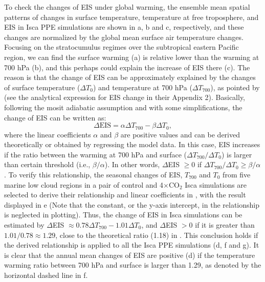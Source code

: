 To check the changes of EIS under global warming, the ensemble mean spatial patterns of changes in surface temperature, temperature at free troposphere, and EIS in Isca PPE simulations are shown in a, b and c, respectively, and these changes are normalized by the global mean surface air temperature changes. Focusing on the stratocumulus regimes over the subtropical eastern Pacific region, we can find the surface warming (a) is relative lower than the warming at 700 hPa (b), and this perhaps could explain the increase of EIS there (c). The reason is that the change of EIS can be approximately explained by the changes of surface temperature ($\Delta T_0$) and temperature at 700 hPa ($\Delta T_{700}$), as pointed by \cite{Qu2014} (see the analytical expression for EIS change in their Appendix 2). Basically, following the mosit adiabatic assumption and with some simplifications, the change of EIS can be written as:
\begin{equation}
    \Delta\text{EIS} =\alpha \Delta T_{700} - \beta \Delta T_0,
    \label{eq:eis_change_T0_T700}
\end{equation}
where the linear coefficients $\alpha$ and $\beta$ are positive values and can be derived theoretically or obtained by regressing the model data. In this case, EIS increases if the ratio between the warming at 700 hPa and surface ($\Delta T_{700}/\Delta T_0$) is larger than certain threshold (i.e., $\beta/\alpha$). In other words, $\Delta$EIS $\geq 0$ if $\Delta T_{700}/\Delta T_0\geq \beta/\alpha$. To verify this relationship, the seasonal changes of EIS, $T_{700}$ and $T_{0}$ from five marine low cloud regions \citep{Klein1993,Qu2014} in a pair of control and 4$\times$CO$_2$ Isca simulations are selected to derive their relationship and linear coefficients in , with the result displayed in e (Note that the constant, or the y-axis intercept, in the relationship is neglected in plotting). Thus, the change of EIS in Isca simulations can be estimated by $\Delta$EIS $\approx 0.78\Delta T_{700} - 1.01\Delta T_0$, and $\Delta$EIS $>0$ if it is greater than $1.01/0.78\approx1.29$, close to the theoretical ratio (1.18) in \cite{Qu2014}. This conclusion holds if the derived relationship is applied to all the Isca PPE simulations (d, f and g). It is clear that the annual mean changes of EIS are positive (d) if the temperature warming ratio between 700 hPa and surface is larger than 1.29, as denoted by the horizontal dashed line in f. 

